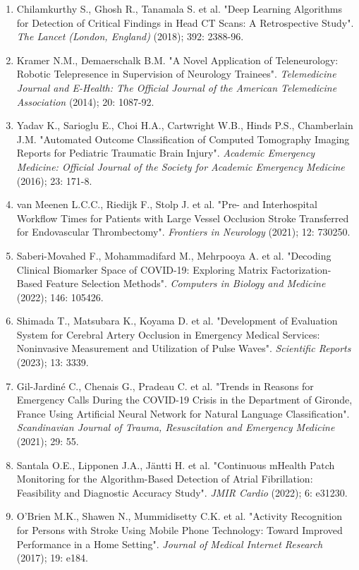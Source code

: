 {{\begin{enumerate}
    \item Chilamkurthy S., Ghosh R., Tanamala S. et al. "Deep Learning Algorithms for Detection of Critical Findings in Head CT Scans: A Retrospective Study". \textit{The Lancet (London, England)} (2018); 392: 2388-96.
    \item Kramer N.M., Demaerschalk B.M. "A Novel Application of Teleneurology: Robotic Telepresence in Supervision of Neurology Trainees". \textit{Telemedicine Journal and E-Health: The Official Journal of the American Telemedicine Association} (2014); 20: 1087-92.
    \item Yadav K., Sarioglu E., Choi H.A., Cartwright W.B., Hinds P.S., Chamberlain J.M. "Automated Outcome Classification of Computed Tomography Imaging Reports for Pediatric Traumatic Brain Injury". \textit{Academic Emergency Medicine: Official Journal of the Society for Academic Emergency Medicine} (2016); 23: 171-8.
    \item van Meenen L.C.C., Riedijk F., Stolp J. et al. "Pre- and Interhospital Workflow Times for Patients with Large Vessel Occlusion Stroke Transferred for Endovascular Thrombectomy". \textit{Frontiers in Neurology} (2021); 12: 730250.
    \item Saberi-Movahed F., Mohammadifard M., Mehrpooya A. et al. "Decoding Clinical Biomarker Space of COVID-19: Exploring Matrix Factorization-Based Feature Selection Methods". \textit{Computers in Biology and Medicine} (2022); 146: 105426.
    \item Shimada T., Matsubara K., Koyama D. et al. "Development of Evaluation System for Cerebral Artery Occlusion in Emergency Medical Services: Noninvasive Measurement and Utilization of Pulse Waves". \textit{Scientific Reports} (2023); 13: 3339.
    \item Gil-Jardiné C., Chenais G., Pradeau C. et al. "Trends in Reasons for Emergency Calls During the COVID-19 Crisis in the Department of Gironde, France Using Artificial Neural Network for Natural Language Classification". \textit{Scandinavian Journal of Trauma, Resuscitation and Emergency Medicine} (2021); 29: 55.
    \item Santala O.E., Lipponen J.A., Jäntti H. et al. "Continuous mHealth Patch Monitoring for the Algorithm-Based Detection of Atrial Fibrillation: Feasibility and Diagnostic Accuracy Study". \textit{JMIR Cardio} (2022); 6: e31230.
    \item O'Brien M.K., Shawen N., Mummidisetty C.K. et al. "Activity Recognition for Persons with Stroke Using Mobile Phone Technology: Toward Improved Performance in a Home Setting". \textit{Journal of Medical Internet Research} (2017); 19: e184.

\end{enumerate}}}
